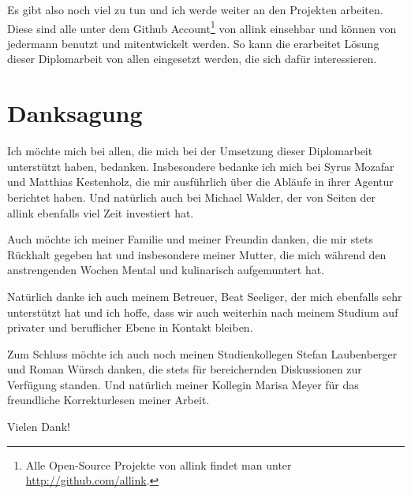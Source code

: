 Es gibt also noch viel zu tun und ich werde weiter an den Projekten arbeiten. 
Diese sind alle unter dem Github Account\footnote{Alle Open-Source
Projekte von allink findet man unter \url{http://github.com/allink}.} von allink
einsehbar und können von jedermann benutzt und mitentwickelt werden. So kann
die erarbeitet Lösung dieser Diplomarbeit von allen eingesetzt werden, die
sich dafür interessieren. 

\section{Danksagung}
Ich möchte mich bei allen, die mich bei der Umsetzung dieser Diplomarbeit
unterstützt haben, bedanken. Insbesondere bedanke ich mich bei Syrus Mozafar
und Matthias Kestenholz, die mir ausführlich über die Abläufe in ihrer Agentur
berichtet haben. Und natürlich auch bei Michael Walder, der von Seiten der allink
ebenfalls viel Zeit investiert hat.

Auch möchte ich meiner Familie und meiner Freundin danken, die mir stets Rückhalt 
gegeben hat und insbesondere meiner Mutter, die mich während den anstrengenden Wochen 
Mental und kulinarisch aufgemuntert hat.

Natürlich danke ich auch meinem Betreuer, Beat Seeliger, der mich ebenfalls
sehr unterstützt hat und ich hoffe, dass wir auch weiterhin nach meinem
Studium auf privater und beruflicher Ebene in Kontakt bleiben.

Zum Schluss möchte ich auch noch meinen Studienkollegen Stefan Laubenberger
und Roman Würsch danken, die stets für bereichernden Diskussionen zur 
Verfügung standen. Und natürlich meiner Kollegin Marisa Meyer für das freundliche 
Korrekturlesen meiner Arbeit.

Vielen Dank!

